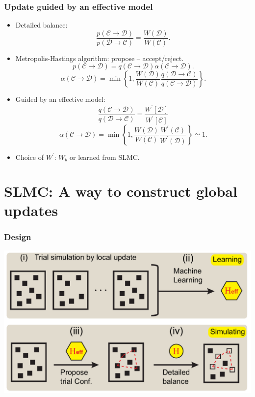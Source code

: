 \documentclass[xcolor=table, 10pt, aspectratio=43]{beamer}
\begin{document}
\begin{frame}
  \frametitle{Update guided by an effective model}
  \begin{itemize}
    \item Detailed balance:
    \[\frac{p(\mathcal C\rightarrow\mathcal D)}{p(\mathcal D\rightarrow\mathcal C)}=\frac{W(\mathcal D)}{W(\mathcal C)}.\]
    \item Metropolis-Hastings algorithm: propose -- accept/reject.
    \[p(\mathcal C\rightarrow\mathcal D) = q(\mathcal C\rightarrow\mathcal D)
    \alpha(\mathcal C\rightarrow\mathcal D).\]
    \[\alpha(\mathcal C\rightarrow\mathcal D) =
    \min\left\{1, \frac{W(\mathcal D)}{W(\mathcal C)}
    \frac{q(\mathcal D\rightarrow\mathcal C)}
    {q(\mathcal C\rightarrow\mathcal D)}\right\}.\]
    \item Guided by an effective model:
    \[\frac{q(\mathcal C\rightarrow\mathcal D)}
    {q(\mathcal D\rightarrow\mathcal C)}
    =\frac{W^\prime[\mathcal D]}{W^\prime[\mathcal C]}\]
    \[\alpha(\mathcal C\rightarrow \mathcal D)=\min\left\{1, \frac{W(\mathcal D)}{W(\mathcal C)}
    \frac{W^\prime(\mathcal C)}{W^\prime(\mathcal D)}\right\}\simeq1.\]
    \item Choice of $W^\prime$: $W_b$ or learned from SLMC.
  \end{itemize}
\end{frame}

\section{SLMC: A way to construct global updates}

\begin{frame}
  \frametitle{Design}
  \begin{center}
    \includegraphics[width=\textwidth]{slmc-design}
  \end{center}
\end{frame}
\end{document}
